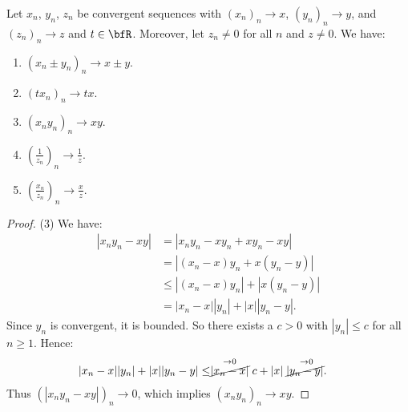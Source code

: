     \begin{theorem}
        Let $x_n$, $y_n$, $z_n$ be convergent sequences with $(x_n)_n \rightarrow x$, $(y_n)_n \rightarrow y$, and $(z_n)_n \rightarrow z$ and $t \in \bfR$. Moreover, let $z_n \neq 0$ for all $n$ and $z \neq 0$. We have:
            \begin{enumerate}[label = (\arabic*)]
                \item $(x_n \pm y_n)_n \rightarrow x \pm y$. 
                \item $(tx_n)_n \rightarrow tx$.
                \item $(x_n y_n)_n \rightarrow xy$.
                \item $\left(\frac{1}{z_n}\right)_n \rightarrow \frac{1}{z}$.
                \item $\left(\frac{x_n}{z_n}\right)_n \rightarrow \frac{x}{z}$.
            \end{enumerate}
    \end{theorem}
        \begin{proof}
            (3) We have:
                \begin{equation*}
                \begin{split}
                    |x_n y_n - xy|
                    & = |x_n y_n - xy_n + x y_n - xy| \\
                    & = \left|(x_n - x)y_n + x(y_n - y)\right|\\
                    & \leq |(x_n - x)y_n |+| x(y_n - y)| \\
                    & = |x_n - x||y_n| + |x||y_n - y|.
                \end{split}
                \end{equation*}
            Since $y_n$ is convergent, it is bounded. So there exists a $c > 0$ with $|y_n| \leq c$ for all $n \geq 1$. Hence:
                \begin{equation*}
                \begin{split}
                    |x_n - x||y_n| + |x||y_n - y|
                    & \leq \stackrel{\rightarrow 0}{\cancel{|x_n -x|}}c + |x|\stackrel{\rightarrow 0}{\cancel{|y_n - y|}.}
                \end{split}
                \end{equation*}
            Thus $(|x_n y_n - xy|)_n \rightarrow 0$, which implies $(x_n y_n)_n \rightarrow xy$.
        \end{proof}

    

